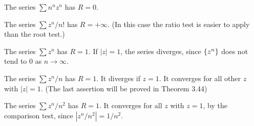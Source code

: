 \begin{newexample}
    \begin{asparaenum}[(a)]
    \item The series $\sum n^n z^n$ has $R = 0$.
    \item The series $\sum z^n / n!$ has $R = +\infty$.
    (In this case the ratio test is easier to apply than the root test.)
    \item The series $\sum z^n$ has $R = 1$.
    If $|z| = 1$, the series diverges, since $\protect\{z^n\}$ does not tend to $0$ as $n \rightarrow \infty $.
    \item The series $\sum z^n / n$ has $R = 1$.
    It diverges if $z = 1$. It converges for all other $z$ with $|z|=1$.
    (The last assertion will be proved in Theorem 3.44)
    \item The series $\sum z^n / n^2$ has $R = 1$.
    It converges for all $z$ with $z = 1$,
    by the comparison test, since $|z^n/n^2| = 1/n^2$.
    \end{asparaenum}
\end{newexample}
